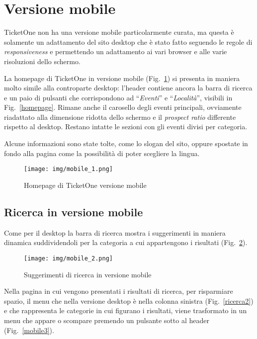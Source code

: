 \section{Versione mobile}\label{mobile}

TicketOne non ha una versione mobile particolarmente curata, ma questa è solamente un adattamento del sito desktop che è stato fatto seguendo le regole di \textit{responsiveness} e permettendo un adattamento ai vari browser e alle varie risoluzioni dello schermo.
\par La homepage di TicketOne in versione mobile (Fig.~\ref{mobile1}) si presenta in maniera molto simile alla controparte desktop: l'header contiene ancora la barra di ricerca e un paio di pulsanti che corrispondono ad ``\textit{Eventi}'' e ``\textit{Località}'', visibili in Fig.~\ref{homepage}.
Rimane anche il carosello degli eventi principali, ovviamente riadattato alla dimensione ridotta dello schermo e il \textit{prospect ratio} differente rispetto al desktop.
Restano intatte le sezioni con gli eventi divisi per categoria.
\par Alcune informazioni sono state tolte, come lo slogan del sito, oppure spostate in fondo alla pagina come la possibilità di poter scegliere la lingua.

\begin{figure}[H]
	\centering
	\texttt{[image: img/mobile\_1.png]}
	\caption{Homepage di TicketOne versione mobile}
	\label{mobile1}
\end{figure}

\subsection{Ricerca in versione mobile}

	Come per il desktop la barra di ricerca mostra i suggerimenti in maniera dinamica suddividendoli per la categoria a cui appartengono i risultati (Fig.~\ref{mobile2}).
	
	\begin{figure}[H]
		\centering
		\texttt{[image: img/mobile\_2.png]}
		\caption{Suggerimenti di ricerca in versione mobile}
		\label{mobile2}
	\end{figure}
	
	Nella pagina in cui vengono presentati i risultati di ricerca, per risparmiare spazio, il menu che nella versione desktop è nella colonna sinistra (Fig.~\ref{ricerca2}) e che rappresenta le categorie in cui figurano i risultati, viene trasformato in un menu che appare o scompare premendo un pulsante sotto al header (Fig.~\ref{mobile3}).
	
